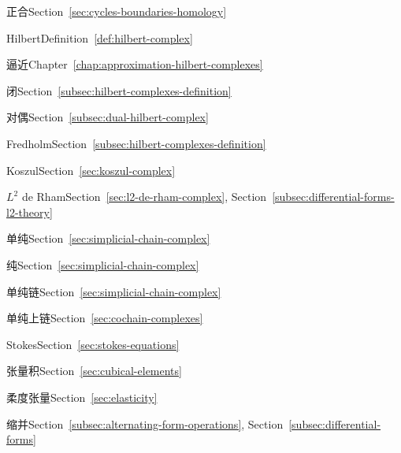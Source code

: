 \begin{theindex}
\subitem {}\label{index:complex-exact}{正合}\quad Section~\ref{sec:cycles-boundaries-homology}

\subitem {}\label{index:complex-hilbert}{Hilbert}\quad Definition~\ref{def:hilbert-complex}

\subsubitem {}\label{index:complex-hilbert-approximation-of}{逼近}\quad Chapter~\ref{chap:approximation-hilbert-complexes}

\subsubitem {}\label{index:complex-hilbert-closed}{闭}\quad Section~\ref{subsec:hilbert-complexes-definition}

\subsubitem {}\label{index:complex-hilbert-dual}{对偶}\quad Section~\ref{subsec:dual-hilbert-complex}

\subsubitem {}\label{index:complex-hilbert-fredholm}{Fredholm}\quad Section~\ref{subsec:hilbert-complexes-definition}

\subitem {}\label{index:complex-koszul}{Koszul}\quad Section~\ref{sec:koszul-complex}

\subitem {}\label{index:complex-l-2-de-rham}{$L^2$ de Rham}\quad Section~\ref{sec:l2-de-rham-complex}, Section~\ref{subsec:differential-forms-l2-theory}

\subitem {}\label{index:complex-simplicial}{单纯}\quad Section~\ref{sec:simplicial-chain-complex}

\subsubitem {}\label{index:complex-simplicial-pure}{纯}\quad Section~\ref{sec:simplicial-chain-complex}

\subitem {}\label{index:complex-simplicial-chain}{单纯链}\quad Section~\ref{sec:simplicial-chain-complex}

\subitem {}\label{index:complex-simplicial-cochain}{单纯上链}\quad Section~\ref{sec:cochain-complexes}

\subitem {}\label{index:complex-stokes}{Stokes}\quad Section~\ref{sec:stokes-equations}

\subitem {}\label{index:complex-tensor-product}{张量积}\quad Section~\ref{sec:cubical-elements}

\item {}\label{index:compliance-tensor}{柔度张量}\quad Section~\ref{sec:elasticity}

\item {}\label{index:contraction}{缩并}\quad Section~\ref{subsec:alternating-form-operations}, Section~\ref{subsec:differential-forms}


\end{theindex}
